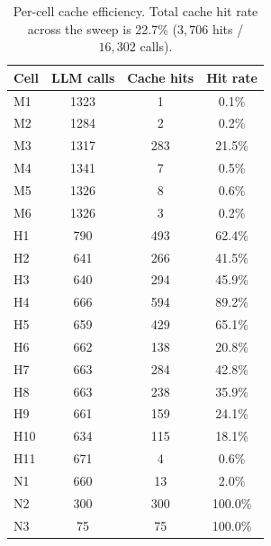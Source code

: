 \begin{table}[!htbp]
\centering
\caption{Per-cell cache efficiency. Total cache hit rate across the sweep is 22.7\% ($3,706$ hits / $16,302$ calls).}
\label{tab:cache_efficiency}
\begin{tabular}{@{}lccc@{}}
\toprule
Cell & LLM calls & Cache hits & Hit rate \\
\midrule
M1 & 1323 & 1 & 0.1\% \\
M2 & 1284 & 2 & 0.2\% \\
M3 & 1317 & 283 & 21.5\% \\
M4 & 1341 & 7 & 0.5\% \\
M5 & 1326 & 8 & 0.6\% \\
M6 & 1326 & 3 & 0.2\% \\
\midrule
H1 & 790 & 493 & 62.4\% \\
H2 & 641 & 266 & 41.5\% \\
H3 & 640 & 294 & 45.9\% \\
H4 & 666 & 594 & 89.2\% \\
H5 & 659 & 429 & 65.1\% \\
H6 & 662 & 138 & 20.8\% \\
H7 & 663 & 284 & 42.8\% \\
H8 & 663 & 238 & 35.9\% \\
H9 & 661 & 159 & 24.1\% \\
H10 & 634 & 115 & 18.1\% \\
H11 & 671 & 4 & 0.6\% \\
\midrule
N1 & 660 & 13 & 2.0\% \\
N2 & 300 & 300 & 100.0\% \\
N3 & 75 & 75 & 100.0\% \\
\bottomrule
\end{tabular}
\end{table}
